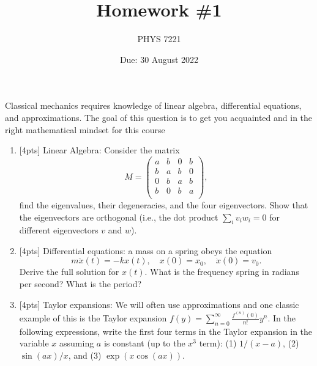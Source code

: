 \documentclass{jhwhw}
\author{PHYS 7221}
\title{Homework \#1}
\date{Due: 30 August 2022}
\begin{document}

Classical mechanics requires knowledge of linear algebra, differential equations, and approximations.
The goal of this question is to get you acquainted and in the right mathematical mindset for this course
\begin{enumerate}
  \item {[4pts]} Linear Algebra: Consider the matrix
        \begin{equation}
          \label{eq:5}
          M =
          \begin{pmatrix}
            a & b & 0 & b \\
            b & a & b & 0 \\
            0 & b & a & b \\
            b & 0 & b & a \\
          \end{pmatrix},
        \end{equation}
      find the eigenvalues, their degeneracies, and the four eigenvectors. Show that the eigenvectors are orthogonal (i.e., the dot product $\sum_{i} v_{i} w_{i} = 0$ for different eigenvectors $v$ and $w$).
  \item {[4pts]} Differential equations: a mass on a spring obeys the equation
        \begin{equation}
          \label{eq:6}
          m \ddot x(t) = - k x(t), \quad x(0) = x_{0}, \quad \dot x(0) = v_{0}.
        \end{equation}
        Derive the full solution for $x(t)$. What is the frequency spring in radians per second? What is the period?
  \item {[4pts]} Taylor expansions: We will often use approximations and one classic example of this is the Taylor expansion $f(y) = \sum_{n=0}^{\infty} \frac{f^{(n)}(0)}{n!} y^{n}$. In the following expressions, write the first four terms in the Taylor expansion in the variable $x$ assuming $a$ is constant (up to the $x^{3}$ term): (1) $1/(x-a)$, (2) $\sin(a x)/x$, and (3) $\exp(x \cos(a x))$.
\end{enumerate}


\end{document}
